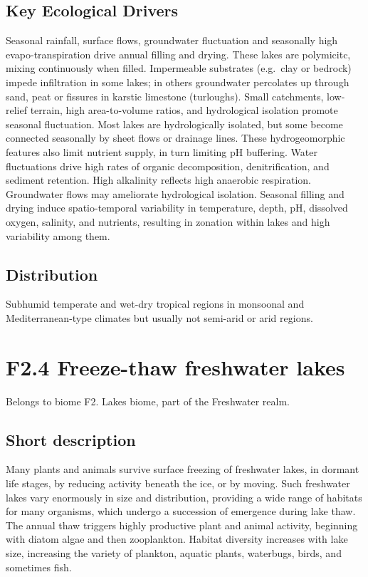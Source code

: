 \documentclass[
  letterpaper,
  DIV=11,
  numbers=noendperiod]{scrartcl}
\begin{document}
\subsection{Key Ecological Drivers}\label{key-ecological-drivers-10}

Seasonal rainfall, surface flows, groundwater fluctuation and seasonally
high evapo-transpiration drive annual filling and drying. These lakes
are polymicitc, mixing continuously when filled. Impermeable substrates
(e.g.~clay or bedrock) impede infiltration in some lakes; in others
groundwater percolates up through sand, peat or fissures in karstic
limestone (turloughs). Small catchments, low-relief terrain, high
area-to-volume ratios, and hydrological isolation promote seasonal
fluctuation. Most lakes are hydrologically isolated, but some become
connected seasonally by sheet flows or drainage lines. These
hydrogeomorphic features also limit nutrient supply, in turn limiting pH
buffering. Water fluctuations drive high rates of organic decomposition,
denitrification, and sediment retention. High alkalinity reflects high
anaerobic respiration. Groundwater flows may ameliorate hydrological
isolation. Seasonal filling and drying induce spatio-temporal
variability in temperature, depth, pH, dissolved oxygen, salinity, and
nutrients, resulting in zonation within lakes and high variability among
them.

\subsection{Distribution}\label{distribution-10}

Subhumid temperate and wet-dry tropical regions in monsoonal and
Mediterranean-type climates but usually not semi-arid or arid regions.

\section{F2.4 Freeze-thaw freshwater
lakes}\label{f2.4-freeze-thaw-freshwater-lakes}

Belongs to biome F2. Lakes biome, part of the Freshwater realm.

\subsection{Short description}\label{short-description-11}

Many plants and animals survive surface freezing of freshwater lakes, in
dormant life stages, by reducing activity beneath the ice, or by moving.
Such freshwater lakes vary enormously in size and distribution,
providing a wide range of habitats for many organisms, which undergo a
succession of emergence during lake thaw. The annual thaw triggers
highly productive plant and animal activity, beginning with diatom algae
and then zooplankton. Habitat diversity increases with lake size,
increasing the variety of plankton, aquatic plants, waterbugs, birds,
and sometimes fish.
\end{document}
